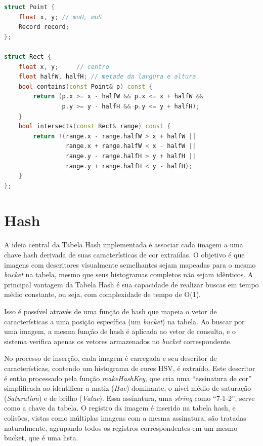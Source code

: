\documentclass{sbc2023}%
\begin{document}
\begin{center}
\begin{lstlisting}[language=c++ ,caption = Estrutura de ponto para análise na Quadtree]
struct Point {
    float x, y; // muH, muS
    Record record;
};

struct Rect {
    float x, y;     // centro
    float halfW, halfH; // metade da largura e altura
    bool contains(const Point& p) const {
        return (p.x >= x - halfW && p.x <= x + halfW &&
                p.y >= y - halfH && p.y <= y + halfH);
    }
    bool intersects(const Rect& range) const {
        return !(range.x - range.halfW > x + halfW ||
                 range.x + range.halfW < x - halfW ||
                 range.y - range.halfH > y + halfH ||
                 range.y + range.halfH < y - halfH);
    }
};
\end{lstlisting}
\end{center}

\section{Hash}
A ideia central da Tabela Hash implementada é associar cada imagem a uma chave hash derivada de suas características de cor extraídas. O objetivo é que imagens com descritores visualmente semelhantes sejam mapeadas para o mesmo \textit{bucket} na tabela, mesmo que seus histogramas completos não sejam idênticos. A principal vantagem da Tabela Hash é sua capacidade de realizar buscas em tempo médio constante, ou seja, com complexidade de tempo de O(1).

Isso é possível através de uma função de hash que mapeia o vetor de características a uma posição específica (um \textit{bucket}) na tabela. Ao buscar por uma imagem, a mesma função de hash é aplicada ao vetor de consulta, e o sistema verifica apenas os vetores armazenados no \textit{bucket} correspondente.

No processo de inserção, cada imagem é carregada e seu descritor de características, contendo um histograma de cores HSV, é extraído. Este descritor é então processado pela função \textit{makeHashKey}, que cria uma “assinatura de cor” simplificada ao identificar a matiz (\textit{Hue}) dominante, o nível médio de saturação (\textit{Saturation}) e de brilho (\textit{Value}). Essa assinatura, uma \textit{string} como “7-1-2”, serve como a chave da tabela. O registro da imagem é inserido na tabela hash, e colisões, vistas como múltiplas imagens com a mesma assinatura, são tratadas naturalmente, agrupando todos os registros correspondentes em um mesmo bucket, que é uma lista.
\end{document}
